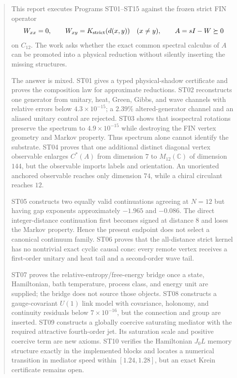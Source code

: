\documentclass[11pt,a4paper]{article}
\begin{document}
\begin{abstract}
This report executes Programs ST01--ST15 against the frozen strict FIN operator
\[
W_{xx}=0,\qquad W_{xy}=K_{\rm strict}(d(x,y))\quad(x\ne y),\qquad
A=sI-W\succeq0
\]
on $C_{12}$. The work asks whether the exact common spectral calculus of $A$ can be promoted into a physical reduction without silently inserting the missing structures.

The answer is mixed. ST01 gives a typed physical-shadow certificate and proves the composition law for approximate reductions. ST02 reconstructs one generator from unitary, heat, Green, Gibbs, and wave channels with relative errors below $4.3\times10^{-15}$; a $2.39\%$ altered-generator channel and an aliased unitary control are rejected. ST03 shows that isospectral rotations preserve the spectrum to $4.9\times10^{-15}$ while destroying the FIN vertex geometry and Markov property. Thus spectrum alone cannot identify the substrate. ST04 proves that one additional distinct diagonal vertex observable enlarges $C^*(A)$ from dimension $7$ to $M_{12}(\mathbb C)$ of dimension $144$, but the observable imports labels and orientation. An unoriented anchored observable reaches only dimension $74$, while a chiral circulant reaches $12$.

ST05 constructs two equally valid continuations agreeing at $N=12$ but having gap exponents approximately $-1.965$ and $-0.086$. The direct integer-distance continuation first becomes signed at distance $8$ and loses the Markov property. Hence the present endpoint does not select a canonical continuum family. ST06 proves that the all-distance strict kernel has no nontrivial exact cyclic causal cone: every remote vertex receives a first-order unitary and heat tail and a second-order wave tail.

ST07 proves the relative-entropy/free-energy bridge once a state, Hamiltonian, bath temperature, process class, and energy unit are supplied; the bridge does not source those objects. ST08 constructs a gauge-covariant $U(1)$ link model with covariance, holonomy, and continuity residuals below $7\times10^{-16}$, but the connection and group are inserted. ST09 constructs a globally coercive saturating mediator with the required attractive fourth-order jet. Its saturation scale and positive coercive term are new axioms. ST10 verifies the Hamiltonian $J_0L$ memory structure exactly in the implemented blocks and locates a numerical transition in mediator speed within $[1.24,1.28]$, but an exact Krein certificate remains open.


\end{abstract}
\end{document}
